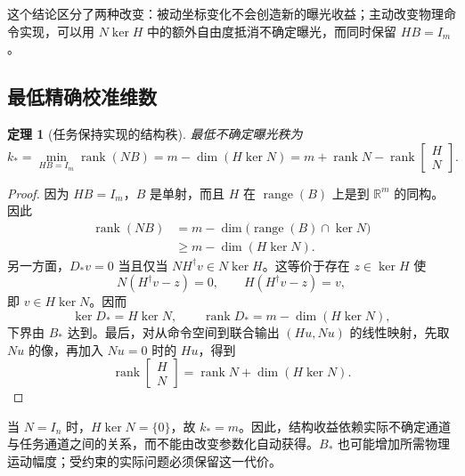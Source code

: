 \documentclass[11pt,a4paper]{article}
\numberwithin{equation}{section}
\newtheorem{theorem}{定理}[section]
\theoremstyle{definition}
\begin{document}
这个结论区分了两种改变：被动坐标变化不会创造新的曝光收益；主动改变物理命令实现，可以用 $N\ker H$ 中的额外自由度抵消不确定曝光，而同时保留 $HB=I_m$。

\subsection{最低精确校准维数}

\begin{theorem}[任务保持实现的结构秩]
\label{thm:cal-rank}
最低不确定曝光秩为
\begin{equation}
  \boxed{
  k_*=
  \min_{HB=I_m}\operatorname{rank}(NB)
  =m-\dim(H\ker N)
  =m+\operatorname{rank}N-
  \operatorname{rank}
  \begin{bmatrix}H\\N\end{bmatrix}.}
  \label{eq:cal-kstar}
\end{equation}
\end{theorem}

\begin{proof}
因为 $HB=I_m$，$B$ 是单射，而且 $H$ 在 $\operatorname{range}(B)$ 上是到 $\mathbb R^m$ 的同构。因此
\begin{align}
  \operatorname{rank}(NB)
  &=m-\dim\big(\operatorname{range}(B)\cap\ker N\big)\\
  &\ge m-\dim(H\ker N).
  \label{eq:cal-rank-lower}
\end{align}
另一方面，$D_*v=0$ 当且仅当 $NH^\dagger v\in N\ker H$。这等价于存在 $z\in\ker H$ 使
\begin{equation}
  N(H^\dagger v-z)=0,\qquad
  H(H^\dagger v-z)=v ,
\end{equation}
即 $v\in H\ker N$。因而
\begin{equation}
  \ker D_*=H\ker N,\qquad
  \operatorname{rank}D_*=m-\dim(H\ker N),
\end{equation}
下界由 $B_*$ 达到。最后，对从命令空间到联合输出 $(Hu,Nu)$ 的线性映射，先取 $Nu$ 的像，再加入 $Nu=0$ 时的 $Hu$，得到
\begin{equation}
  \operatorname{rank}
  \begin{bmatrix}H\\N\end{bmatrix}
  =\operatorname{rank}N+\dim(H\ker N).
\end{equation}
\end{proof}

当 $N=I_n$ 时，$H\ker N=\{0\}$，故 $k_*=m$。因此，结构收益依赖实际不确定通道与任务通道之间的关系，而不能由改变参数化自动获得。$B_*$ 也可能增加所需物理运动幅度；受约束的实际问题必须保留这一代价。
\end{document}
